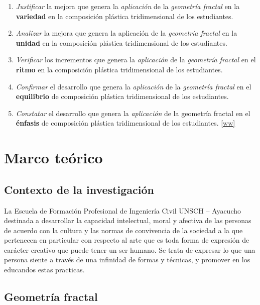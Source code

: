 \documentclass[12pt,]{report}
\begin{document}
\begin{enumerate}
\def\labelenumi{\arabic{enumi}.}
\item
  \emph{Justificar} la mejora que genera la \emph{aplicación} de la \emph{geometría fractal} en la \textbf{variedad}
  en la composición plástica tridimensional de los estudiantes.
\item
  \emph{Analizar} la mejora que genera la aplicación de la \emph{geometría fractal} en la \textbf{unidad} en
  la composición plástica tridimensional de los estudiantes.
\item
  \emph{Verificar} los incrementos que genera la \emph{aplicación} de la \emph{geometría fractal} en el
  \textbf{ritmo} en la composición plástica tridimensional de los estudiantes.
\item
  \emph{Confirmar} el desarrollo que genera la \emph{aplicación} de la \emph{geometría fractal} en el \textbf{equilibrio}
  de composición plástica tridimensional de los estudiantes.
\item
  \emph{Constatar} el desarrollo que genera la \emph{aplicación} de la geometría fractal en el \textbf{énfasis}
  de composición plástica tridimensional de los estudiantes. \ref{ww}
\end{enumerate}

\hypertarget{marco-teuxf3rico}{%
\chapter{Marco teórico}\label{marco-teuxf3rico}}

\hypertarget{contexto-de-la-investigaciuxf3n}{%
\section{Contexto de la investigación}\label{contexto-de-la-investigaciuxf3n}}

La Escuela de Formación Profesional de Ingeniería Civil UNSCH -- Ayacucho destinada a
desarrollar la capacidad intelectual, moral y afectiva de las personas de acuerdo con la cultura
y las normas de convivencia de la sociedad a la que pertenecen en particular con respecto al
arte que es toda forma de expresión de carácter creativo que puede tener un ser humano. Se
trata de expresar lo que una persona siente a través de una infinidad de formas y técnicas, y
promover en los educandos estas practicas.

\hypertarget{geometruxeda-fractal}{%
\section{Geometría fractal}\label{geometruxeda-fractal}}
\end{document}
